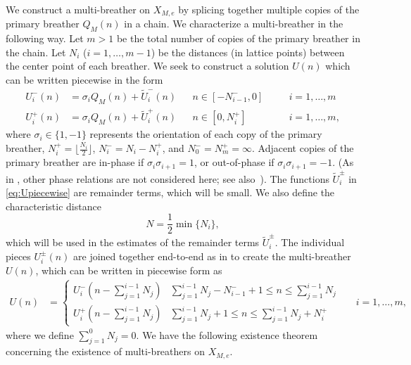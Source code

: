 \documentclass[12pt,reqno]{amsart}
\theoremstyle{definition}
\begin{document}
We construct a multi-breather on $X_{M,e}$ by splicing together multiple copies of the primary breather $Q_M(n)$ in a chain. We characterize a multi-breather in the following way. Let $m > 1$ be the total number of copies of the primary breather in the chain. Let $N_i$ ($i = 1, \dots, m-1$) be the distances (in lattice points) between the center point of each breather. We seek to construct a solution $U(n)$ which can be written piecewise in the form
\begin{equation}\label{eq:Upiecewise}
\begin{aligned}
U_i^-(n) &= \sigma_i Q_M(n) + \tilde{U}_i^-(n) && n \in [-N_{i-1}^-, 0] && \quad i = 1, \dots, m\\
U_i^+(n) &= \sigma_i Q_M(n) + \tilde{U}_i^+(n) && n \in [0, N_i^+] && \quad i = 1, \dots, m,
\end{aligned}
\end{equation}
where $\sigma_i \in \{1, -1\}$ represents the orientation of each copy of the primary breather, $N_i^+ = \lfloor \frac{N_i}{2} \rfloor$, $N_i^- = N_i - N_i^+$, and $N_0^- = N_m^+ = \infty$. Adjacent copies of the primary breather are in-phase if $\sigma_i \sigma_{i+1} = 1$, or out-of-phase if $\sigma_i \sigma_{i+1} = -1$. (As in \cite{Pelinovsky2012}, other phase relations are not considered here; see also~\cite{KOUKOULOYANNIS20132022}). The functions $\tilde{U}_i^\pm$ in \cref{eq:Upiecewise} are remainder terms, which will be small. We also define the characteristic distance
\begin{equation}\label{defN}
N = \frac{1}{2} \min\{ N_i \},
\end{equation}
which will be used in the estimates of the remainder terms $\tilde{U}_i^\pm$. The individual pieces $U_i^\pm(n)$ are joined together end-to-end as in \cites{Sandstede1998,Knobloch2000,Parker2020,Parker2021} to create the multi-breather $U(n)$, which can be written in piecewise form as
\begin{equation}
\begin{aligned}
U(n) &= \begin{cases}
U_i^-\left( n - \sum_{j=1}^{i-1}N_j \right) & \sum_{j=1}^{i-1}N_j - N_{i-1}^- + 1 \leq n \leq \sum_{j=1}^{i-1}N_j \\
U_i^+\left( n - \sum_{j=1}^{i-1}N_j \right) & \sum_{j=1}^{i-1}N_j + 1 \leq n \leq \sum_{j=1}^{i-1}N_j + N_i^+
\end{cases}
&& i = 1, \dots, m,
\end{aligned}
\end{equation}
where we define $\sum_{j=1}^0 N_j = 0$. We have the following existence theorem concerning the existence of multi-breathers on $X_{M,e}$. 
\end{document}
